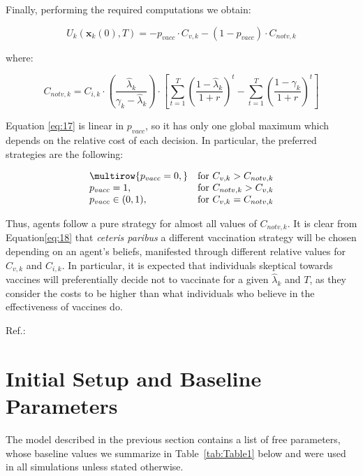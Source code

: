 \documentclass[11pt]{article}
\begin{document}
Finally, performing the required computations we obtain: 

\begin{equation}\label{eq:16}
	U_k(\mathbf{x}_k(0), T)=-p_{vacc} \cdot C_{v,k} - (1-p_{vacc}) \cdot C_{notv,k}
\end{equation}

where: 

\begin{equation}\label{eq:17}
	C_{notv,k}=C_{i,k} \cdot \left( \frac{\hat{\lambda}_{k}}{\gamma_{k}-\hat{\lambda}_{k}} \right) \cdot \left[\sum_{t = 1}^{T} \left(\frac{1-\hat{\lambda}_{k}}{1+r}\right)^t - \sum_{t = 1}^{T}\left(\frac{1-\gamma_k}{1+r}\right)^t\right]
\end{equation}

Equation \eqref{eq:17} is linear in \(p_{vacc}\), so it has only one global maximum which depends on the relative cost of each decision. In particular, the preferred strategies are the following:

\begin{equation}\label{eq:18}
	\begin{array}
	{@{}lr@{}}
        \multirow{p_{vacc}=0,} & \text{for }C_{v,k}>C_{notv,k} \\
        {p_{vacc}=1,} & \text{for }C_{notv,k}>C_{v,k} \\
        {p_{vacc}\in(0,1),} & \text{for }C_{v,k}=C_{notv,k} \\
    \end{array}
\end{equation}

Thus, agents follow a pure strategy for almost all values of \(C_{notv,k}\). It is clear from Equation\eqref{eq:18} that \textit{ceteris paribus} a different vaccination strategy will be chosen depending on an agent's beliefs, manifested through different relative values for \(C_{v,k}\) and \(C_{i,k}\). In particular, it is expected that individuals skeptical towards vaccines will preferentially decide not to vaccinate for a given \(\hat{\lambda}_{k}\) and \(T\), as they consider the costs to be higher than what individuals who believe in the effectiveness of vaccines do.

Ref.:
\cite{shim2012}

\section{Initial Setup and Baseline Parameters}

The model described in the previous section contains a list of free parameters, whose baseline values we summarize in Table~\ref{tab:Table1} below and were used in all simulations unless stated otherwise.
\end{document}
